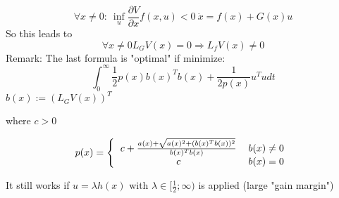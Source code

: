 \begin{equation*}
\forall x \neq 0: \ \inf_{u} \frac{\partial V}{\partial x} f(x,u) < 0 \ \dot{x} = f(x) + G(x)u
\end{equation*}
So this leads to
\begin{equation*}
\forall x \neq 0 L_G V(x) = 0 \Rightarrow L_fV(x) \neq 0
\end{equation*}
Remark: The last formula is "optimal" if minimize:
\begin{equation*}
\int_{0}^{\infty}\frac{1}{2}p(x)b(x)^Tb(x) + \frac{1}{2p(x)}u^Tudt
\end{equation*}
$b(x) := (L_GV(x))^T$

where $c > 0$

\begin{equation*}
p(x) = \left \{ 
\begin{tabular}{cc} 
$c + \frac{a(x) + \sqrt{a(x)^2 + (b(x)^Tb(x))^2}}{b(x)^Tb(x)}$ & $b(x) \neq 0$ \\ 
$c$ & $b(x) = 0$ 
\end{tabular} 
\right.
\end{equation*}

It still works if $u = \lambda h(x)$ with $\lambda \in [\frac{1}{2}; \infty)$ is applied (large "gain margin")